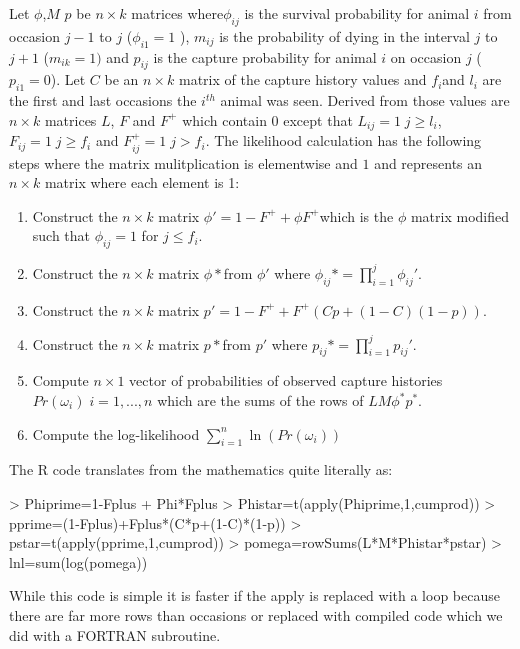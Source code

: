 \documentclass[12pt]{article}
\begin{document}
Let $\phi$,$M$ $p$ be $n\times k$ matrices where$\phi_{ij}$ is
the survival probability for animal $i$ from occasion $j-1$ to $j$
($\phi_{i1}=1$ ), $m_{ij}$ is the probability of dying in the interval
$j$ to $j+1$ ($m_{ik}=1)$ and $p_{ij}$ is the capture probability
for animal $i$ on occasion $j$ ($p_{i1}=0$). Let $C$ be an $n\times k$
matrix of the capture history values and $f_{i}$and $l_{i}$ are
the first and last occasions the $i^{th}$ animal was seen. Derived
from those values are $n\times k$ matrices $L$, $F$ and $F^{+}$
which contain 0 except that $L_{ij}=1\; j\geq l_{i}$,$F_{ij}=1\; j\geq f_{i}$
and $F_{ij}^{+}=1\; j>f_{i}$. The likelihood calculation has the
following steps where the matrix mulitplication is elementwise and
$1$ and represents an $n\times k$ matrix where each element is 1:
\begin{enumerate}
\item Construct the $n\times k$ matrix $\phi'=1-F^{+}+\phi F^{+}$which
is the $\phi$ matrix modified such that $\phi_{ij}=1$ for $j\leq f_{i}$.
\item Construct the $n\times k$ matrix $\phi*$from $\phi'$ where $\phi_{ij}*=\prod_{i=1}^{j}\phi_{ij}'$.
\item Construct the $n\times k$ matrix $p'=1-F^{+}+F^{+}(Cp+(1-C)(1-p))$.
\item Construct the $n\times k$ matrix $p*$from $p'$ where $p_{ij}*=\prod_{i=1}^{j}p_{ij}'$.
\item Compute $n\times1$ vector of probabilities of observed capture histories
$Pr(\omega_{i})\; i=1,...,n$ which are the sums of the rows of $LM\phi^{*}p^{*}$.
\item Compute the log-likelihood $\sum_{i=1}^{n}\ln(Pr(\omega_{i}))$
\end{enumerate}
The R code translates from the mathematics quite literally as: 

\begin{Schunk}
\begin{Sinput}
>  Phiprime=1-Fplus + Phi*Fplus
>  Phistar=t(apply(Phiprime,1,cumprod))
>  pprime=(1-Fplus)+Fplus*(C*p+(1-C)*(1-p))
>  pstar=t(apply(pprime,1,cumprod))
>  pomega=rowSums(L*M*Phistar*pstar)
>  lnl=sum(log(pomega))
\end{Sinput}
\end{Schunk}

\noindent While this code is simple it is faster if the apply is replaced
with a loop because there are far more rows than occasions or replaced
with compiled code which we did with a FORTRAN subroutine.
\end{document}
